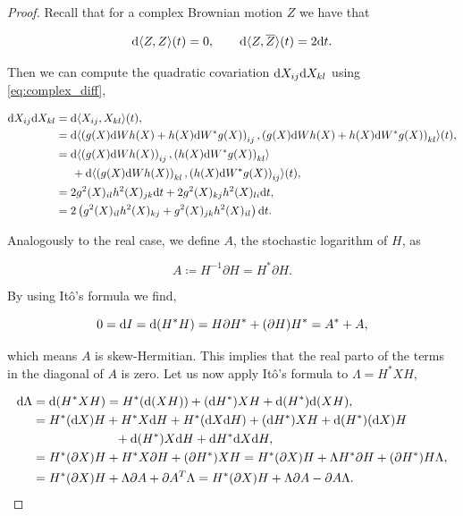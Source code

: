 \begin{proof} 
    Recall that for a complex Brownian motion $Z$ we have that

    \[\mathrm d\langle Z,Z\rangle(t) = 0, \qquad \mathrm d \langle Z ,\overline Z\rangle(t) = 2\mathrm d t.\]

    
    Then we can compute the quadratic covariation $\mathrm d X_{ij}\mathrm d X_{kl}$ using \eqref{eq:complex_diff},

    \begin{align*}
        \mathrm d X_{ij}\mathrm d X_{kl} &=  \mathrm d\langle X_{ij},X_{kl} \rangle(t), \\
        &= \mathrm d\langle \left( g(X)\mathrm d  W h(X) + h(X)\mathrm d W^* g(X) \right)_{ij}, \left(g(X)\mathrm d W h(X) + h(X)\mathrm d W^* g(X)\right)_{kl} \rangle(t),\\
        &= \mathrm d\langle \left(g(X)\mathrm d  W h(X)\right)_{ij}, \left(h(X)\mathrm d W^* g(X)\right)_{kl}\rangle \\
        &\phantom{esp}+ \mathrm d\langle \left(g(X)\mathrm d  W h(X)\right)_{kl}, \left(h(X)\mathrm d W^* g(X)\right)_{ij}\rangle(t),\\
        &= 2g^2(X)_{il}h^2(X)_{jk}\mathrm d t + 2g^2(X)_{kj}h^2(X)_{li}\mathrm d t,\\
        &= 2\left( g^2(X)_{il}h^2(X)_{kj} + g^2(X)_{jk}h^2(X)_{il} \right)\mathrm d t.
    \end{align*}


    Analogously to the real case, we define $A$, the stochastic logarithm of $H$, as

    \begin{equation*}
        A \coloneqq H^{-1}\partial H = H^* \partial H.
    \end{equation*}

    By using Itô's formula we find,

    \begin{equation*}
        0 = \mathrm d I = \mathrm d(H^*H) = H \partial H^* + (\partial H) H^* = A^* + A,
    \end{equation*}

    \noindent which means $A$ is skew-Hermitian. This implies that the real parto of the terms in the diagonal of $A$ is zero. Let us now apply Itô's formula to $\Lambda = H^* X H$,

    \begin{align*} %
        \d \Lambda &= \d(H^* X H) = H^*(\d(XH)) + (\d H^*) XH + \d(H^*)\d (XH),\\
        &= H^*(\d X) H + H^* X \d H + H^*(\d X\d H) + (\d H^*)X H + \d(H^*)(\d X)H\\
        &\phantom{espacioooooooo} + \d(H^*)X\d H + \d H^*\d X\d H,\\
        &= H^*(\partial X)H + H^*X\partial H + (\partial H^*)XH = H^*(\partial X)H + \Lambda H^* \partial H + (\partial H^*)H\Lambda,\\
        &= H^*(\partial X)H + \Lambda \partial A + \trans{\partial A}\Lambda = H^*(\partial X)H + \Lambda \partial A - \partial A \Lambda.
    \end{align*}


\end{proof}
